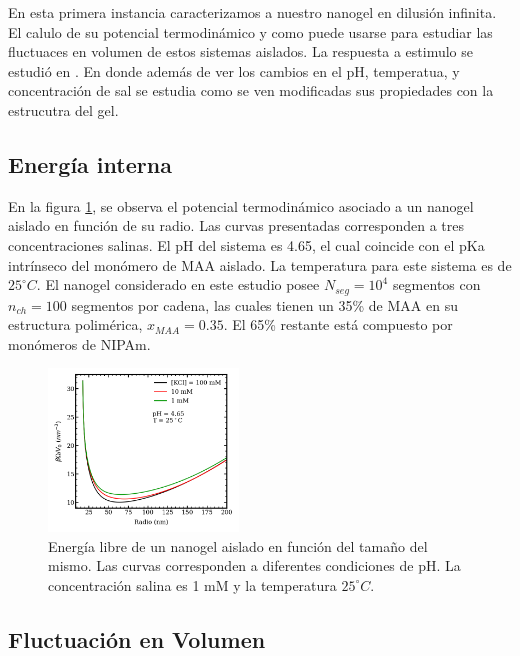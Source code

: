 	En esta primera instancia caracterizamos a nuestro nanogel en dilusi\'on infinita. El calulo de su potencial termodin\'amico y como puede usarse para estudiar las fluctuaces en volumen de estos sistemas aislados.
	La respuesta a estimulo se estudi\'o en \cite{perez2021thermodynamic}. En donde adem\'as de ver los cambios en el pH, temperatua, y concentraci\'on de sal se estudia como se ven modificadas sus propiedades con la estrucutra del gel.
	
	\subsection{Energ\'ia interna}
	
	En la figura \ref{fig:mc:energy-intra}, se observa el potencial termodin\'amico asociado a un nanogel aislado en funci\'on de su radio. Las curvas presentadas corresponden a tres concentraciones salinas. El pH del sistema es 4.65, el cual coincide con el pKa intr\'inseco del mon\'omero de MAA aislado. La temperatura para este sistema es de $25 ^\circ C$.
	El nanogel considerado en este estudio posee $N_{seg}=10^4$ segmentos con $n_{ch}=100$ segmentos por cadena, las cuales tienen un 35\% de MAA en su estructura polim\'erica, $x_{MAA}=0.35$. El 65\% restante est\'a compuesto por mon\'omeros de NIPAm.
	
	
	
	
	\begin{figure}[!htb]
		\centering
		\includegraphics[width=0.45\textwidth]{Figures/graph-mc/interna.png}
		\caption{Energ\'ia libre de un nanogel aislado en funci\'on del tama\~no del mismo. Las curvas corresponden a diferentes condiciones de pH. La concentraci\'on salina es 1 mM y la temperatura $25 ^\circ C$.}
		\label{fig:mc:energy-intra}
	\end{figure}
	
	
	
	
	\subsection{Fluctuaci\'on en Volumen}\label{sec:mc:fluctuacion}
	

